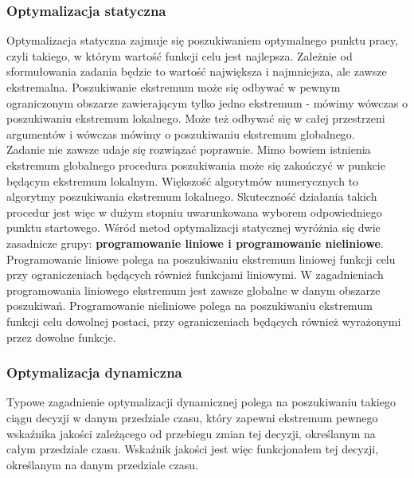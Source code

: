 \documentclass[10pt, a
4paper]{article}
\begin{document}
\subsubsection{Optymalizacja statyczna}
Optymalizacja statyczna zajmuje się poszukiwaniem optymalnego punktu pracy, czyli takiego, w którym wartość funkcji celu jest najlepsza. Zależnie od sformułowania zadania będzie to wartość największa i najmniejsza, ale zawsze ekstremalna. Poszukiwanie ekstremum może się odbywać w pewnym ograniczonym obszarze zawierającym tylko jedno ekstremum - mówimy wówczas o poszukiwaniu ekstremum lokalnego. Może też odbywać się w całej przestrzeni argumentów i wówczas mówimy o poszukiwaniu ekstremum globalnego.\\
\indent Zadanie nie zawsze udaje się rozwiązać poprawnie. Mimo bowiem istnienia ekstremum globalnego procedura poszukiwania może się zakończyć w punkcie będącym ekstremum lokalnym. Większość algorytmów numerycznych to algorytmy poszukiwania ekstremum lokalnego. Skuteczność działania takich procedur jest więc w dużym stopniu uwarunkowana wyborem odpowiedniego punktu startowego.\indent
Wśród metod optymalizacji statycznej wyróżnia się dwie zasadnicze grupy: \textbf{programowanie liniowe i programowanie nieliniowe}. Programowanie liniowe polega na poszukiwaniu ekstremum liniowej funkcji celu przy ograniczeniach będących również funkcjami liniowymi. W zagadnieniach programowania liniowego ekstremum jest zawsze globalne w danym obszarze poszukiwań. Programowanie nieliniowe polega na poszukiwaniu ekstremum funkcji celu dowolnej postaci, przy ograniczeniach będących również wyrażonymi przez dowolne funkcje.
\subsubsection{Optymalizacja dynamiczna}
Typowe zagadnienie optymalizacji dynamicznej polega na poszukiwaniu takiego ciągu decyzji w danym przedziale czasu, który zapewni ekstremum pewnego wskaźnika jakości zależącego od przebiegu zmian tej decyzji, określanym na całym przedziale czasu. Wskaźnik jakości jest więc funkcjonałem tej decyzji, określanym na danym przedziale czasu.
\end{document}
